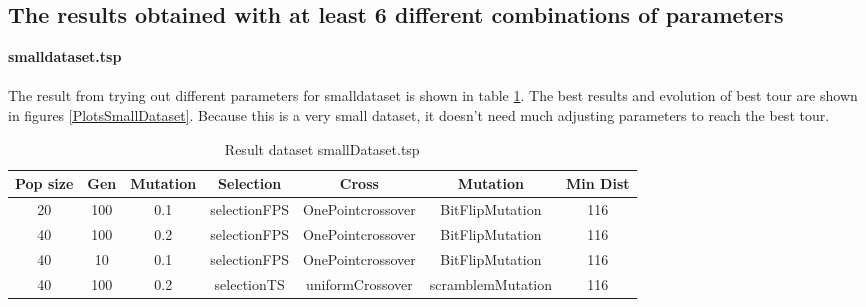 \documentclass[12pt]{report}
\begin{document}
    \subsection{The results obtained with at least 6 different combinations of parameters}
    \textbf{smalldataset.tsp}\\
    \\
    The result from trying out different parameters for smalldataset is shown in table \ref{resultsSmallDataset}. The best results and evolution of best tour are shown in figures \ref{PlotsSmallDataset}. Because this is a very small dataset, it doesn't need much adjusting parameters to reach the best tour.
    \begin{table}
        \centering
        \begin{tabular}{|c|c|c|c|c|c|c|}
            \hline
            Pop size & Gen & Mutation & Selection & Cross & Mutation & Min Dist\\
            \hline
            20 & 100 & 0.1 & selectionFPS & OnePointcrossover & BitFlipMutation & 116 \\
            \hline
            40 & 100 & 0.2 & selectionFPS & OnePointcrossover & BitFlipMutation & 116 \\
            \hline
            40 & 10 & 0.1 & selectionFPS & OnePointcrossover & BitFlipMutation & 116 \\
            \hline
            40 & 100 & 0.2 & selectionTS & uniformCrossover & scramblemMutation & 116 \\
            \hline
            \end{tabular}
        \caption{Result dataset smallDataset.tsp}
        \label{resultsSmallDataset}
    \end{table}
    
\end{document}
